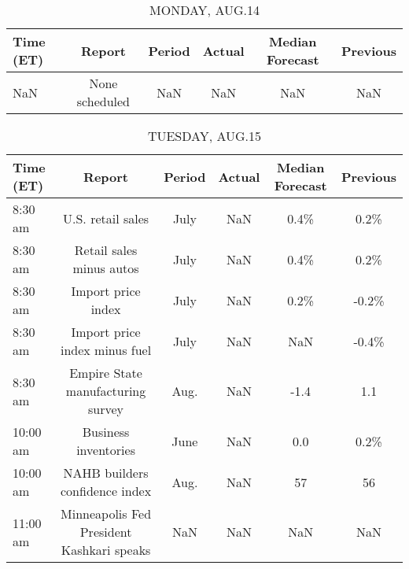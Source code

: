 \documentclass{article}%
\begin{document}
%
\normalsize%


\begin{table}[htbp]%
\caption{MONDAY, AUG.14}%
\centering%
\begin{adjustbox}{width=1\textwidth}%
\begin{tabular}{lccccc}
\toprule
Time (ET) &         Report & Period & Actual & Median Forecast & Previous \\
\midrule
      NaN & None scheduled &    NaN &    NaN &             NaN &      NaN \\
\bottomrule
\end{tabular}
%
\end{adjustbox}%
\end{table}

%


\begin{table}[htbp]%
\caption{TUESDAY, AUG.15}%
\centering%
\begin{adjustbox}{width=1\textwidth}%
\begin{tabular}{lccccc}
\toprule
Time (ET) &                                    Report & Period & Actual & Median Forecast & Previous \\
\midrule
  8:30 am &                         U.S. retail sales &   July &    NaN &            0.4\% &     0.2\% \\
  8:30 am &                  Retail sales minus autos &   July &    NaN &            0.4\% &     0.2\% \\
  8:30 am &                        Import price index &   July &    NaN &            0.2\% &    -0.2\% \\
  8:30 am &             Import price index minus fuel &   July &    NaN &             NaN &    -0.4\% \\
  8:30 am &         Empire State manufacturing survey &   Aug. &    NaN &            -1.4 &      1.1 \\
 10:00 am &                      Business inventories &   June &    NaN &             0.0 &     0.2\% \\
 10:00 am &            NAHB builders confidence index &   Aug. &    NaN &              57 &       56 \\
 11:00 am & Minneapolis Fed President Kashkari speaks &    NaN &    NaN &             NaN &      NaN \\
\bottomrule
\end{tabular}
%
\end{adjustbox}%
\end{table}

%
\end{document}
